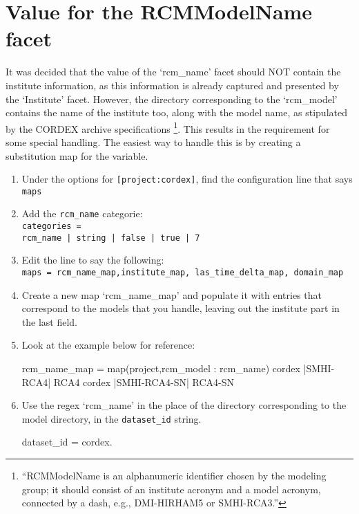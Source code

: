 \section{Value for the RCMModelName facet}
It was decided that the value of the `rcm\_name' facet should NOT contain the institute information, as this information is already captured and presented by the `Institute' facet.  However, the directory corresponding to the `rcm\_model' contains the name of the institute too, along with the model name, as stipulated by the CORDEX archive specifications \footnote{``RCMModelName is an alphanumeric identifier chosen by the modeling group; it should consist of an institute acronym and a model acronym, connected by a dash, e.g., DMI-HIRHAM5 or SMHI-RCA3.''\cite{cordexarchivespecs}}. This results in the requirement for some special handling.
\mypar
The easiest way to handle this is by creating a substitution map for the variable.
\begin{enumerate}
\item Under the options for \texttt{[project:cordex]}, find the configuration line that says \texttt{maps}
\item Add the \texttt{rcm\_name} categorie:\\
\texttt{categories =\\ rcm\_name | string | false | true  | 7}
\item Edit the line to say the following:\\
\texttt{maps = rcm\_name\_map,institute\_map, las\_time\_delta\_map, domain\_map}
\item Create a new map `rcm\_name\_map' and populate it with entries that correspond to  the models that you handle, leaving out the institute part in the last field.
\item Look at the example below for reference:
\begin{verbatimtab}[4]
rcm_name_map = map(project,rcm_model : rcm_name)
    cordex |SMHI-RCA4| RCA4
    cordex |SMHI-RCA4-SN| RCA4-SN
\end{verbatimtab}
\item Use the regex `rcm\_name' in the place of the directory corresponding to the model directory, in the \texttt{dataset\_id} string.
\vspace{-6mm}\\
\begin{verbatimtab}[4]
dataset_id = cordex.%
\end{verbatimtab}
\end{enumerate}
